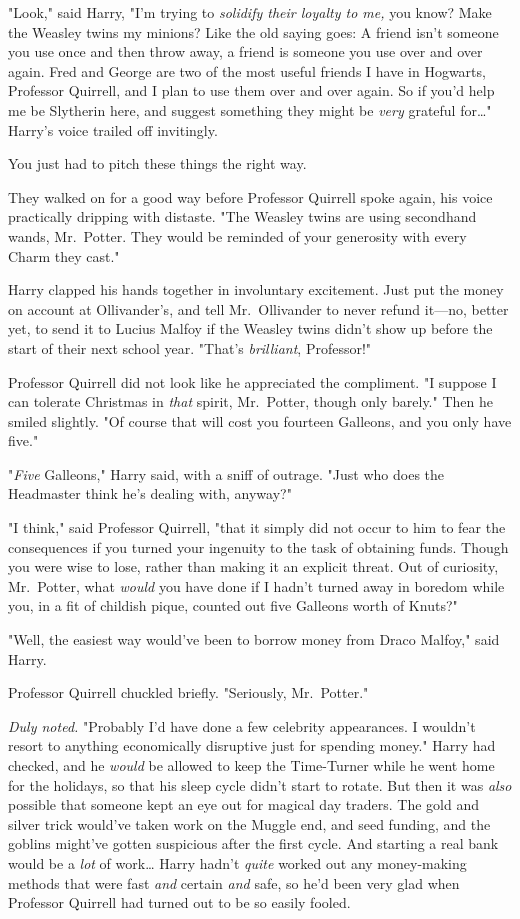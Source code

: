 "Look," said Harry, "I'm trying to \emph{solidify their loyalty to me,} you know? Make the Weasley twins my minions? Like the old saying goes: A friend isn't someone you use once and then throw away, a friend is someone you use over and over again. Fred and George are two of the most useful friends I have in Hogwarts, Professor Quirrell, and I plan to use them over and over again. So if you'd help me be Slytherin here, and suggest something they might be \emph{very} grateful for{\ldots}" Harry's voice trailed off invitingly.

You just had to pitch these things the right way.

They walked on for a good way before Professor Quirrell spoke again, his voice practically dripping with distaste. "The Weasley twins are using secondhand wands, Mr.~Potter. They would be reminded of your generosity with every Charm they cast."

Harry clapped his hands together in involuntary excitement. Just put the money on account at Ollivander's, and tell Mr.~Ollivander to never refund it---no, better yet, to send it to Lucius Malfoy if the Weasley twins didn't show up before the start of their next school year. "That's \emph{brilliant}, Professor!"

Professor Quirrell did not look like he appreciated the compliment. "I suppose I can tolerate Christmas in \emph{that} spirit, Mr.~Potter, though only barely." Then he smiled slightly. "Of course that will cost you fourteen Galleons, and you only have five."

"\emph{Five} Galleons," Harry said, with a sniff of outrage. "Just who does the Headmaster think he's dealing with, anyway?"

"I think," said Professor Quirrell, "that it simply did not occur to him to fear the consequences if you turned your ingenuity to the task of obtaining funds. Though you were wise to lose, rather than making it an explicit threat. Out of curiosity, Mr.~Potter, what \emph{would} you have done if I hadn't turned away in boredom while you, in a fit of childish pique, counted out five Galleons worth of Knuts?"

"Well, the easiest way would've been to borrow money from Draco Malfoy," said Harry.

Professor Quirrell chuckled briefly. "Seriously, Mr.~Potter."

\emph{Duly noted.} "Probably I'd have done a few celebrity appearances. I wouldn't resort to anything economically disruptive just for spending money." Harry had checked, and he \emph{would} be allowed to keep the Time-Turner while he went home for the holidays, so that his sleep cycle didn't start to rotate. But then it was \emph{also} possible that someone kept an eye out for magical day traders. The gold and silver trick would've taken work on the Muggle end, and seed funding, and the goblins might've gotten suspicious after the first cycle. And starting a real bank would be a \emph{lot} of work{\ldots} Harry hadn't \emph{quite} worked out any money-making methods that were fast \emph{and} certain \emph{and} safe, so he'd been very glad when Professor Quirrell had turned out to be so easily fooled.

